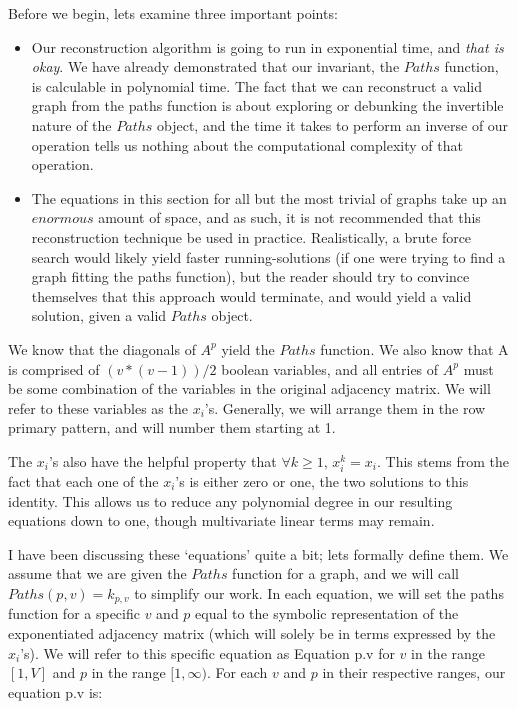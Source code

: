 \documentclass[11pt,a4paper]{report}
\begin{document}
Before we begin, lets examine three important points:
\begin{itemize}
  \item{
  	Our reconstruction algorithm is going to run in exponential time, and \emph{that is okay}.  
  	We have already demonstrated that our invariant, the $Paths$ function, is calculable in polynomial time.  
  	The fact that we can reconstruct a valid graph from the paths function is about exploring or debunking the invertible nature of the $Paths$ object, 
  	and the time it takes to perform an inverse of our operation tells us nothing about the computational complexity of that operation.
  }
  \item{
  	The equations in this section for all but the most trivial of graphs take up an $enormous$ amount of space, and as such, it is not recommended that this reconstruction technique be used in practice.  
  	Realistically, a brute force search would likely yield faster running-solutions (if one were trying to find a graph fitting the paths function), but the reader should try to convince themselves that this approach would terminate, 
  	and would yield a valid solution, given a valid $Paths$ object.
  }
\end{itemize}

We know that the diagonals of $A^p$ yield the $Paths$ function.
We also know that A is comprised of $(v * (v - 1)) / 2$ boolean variables, and all entries of $A^p$ must be some combination of the variables in the original adjacency matrix. 
We will refer to these variables as the $x_i$'s. Generally, we will arrange them in the row primary pattern, and will number them starting at 1.

The $x_i$'s also have the helpful property that $\forall k \geq 1,\, x_i^k = x_i $. 
This stems from the fact that each one of the $x_i$'s is either zero or one, the two solutions to this identity.  
This allows us to reduce any polynomial degree in our resulting equations down to one, though multivariate linear terms may remain.

I have been discussing these `equations' quite a bit; lets formally define them.  
We assume that we are given the $Paths$ function for a graph, and we will call $Paths(p, v) = k_{p, v}$ to simplify our work. 
In each equation, we will set the paths function for a specific $v$ and $p$ equal to the symbolic representation of the exponentiated adjacency matrix (which will solely be in terms expressed by the $x_i$'s).
We will refer to this specific equation as Equation p.v for $v$ in the range $[1, V]$ and $p$ in the range $[1, \infty)$.
For each $v$ and $p$ in their respective ranges, our equation p.v is:
\end{document}
